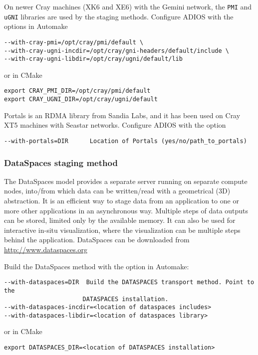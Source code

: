 \vspace*{6pt}
On newer Cray machines (XK6 and XE6) with the Gemini network, the \verb+PMI+ and \verb+uGNI+ libraries are used by the staging methods. Configure ADIOS with the options in Automake

\begin{lstlisting}
--with-cray-pmi=/opt/cray/pmi/default \
--with-cray-ugni-incdir=/opt/cray/gni-headers/default/include \
--with-cray-ugni-libdir=/opt/cray/ugni/default/lib
\end{lstlisting}

\noindent or in CMake
\begin{lstlisting}
export CRAY_PMI_DIR=/opt/cray/pmi/default
export CRAY_UGNI_DIR=/opt/cray/ugni/default
\end{lstlisting}

\vspace*{6pt}
Portals is an RDMA library from Sandia Labs, and it has been used on Cray XT5 machines with Seastar networks. Configure ADIOS with the option

\verb+--with-portals=DIR      Location of Portals (yes/no/path_to_portals)+

\subsubsection{DataSpaces staging method}
The DataSpaces model provides a separate server running on separate compute nodes, into/from which data can be written/read with a geometrical (3D) abstraction. It is an efficient way to stage data from an application to one or more other applications in an asynchronous way. Multiple steps of data outputs can be stored, limited only by the available memory.
It can also be used for interactive in-situ visualization, where the visualization can be multiple steps behind the application.
DataSpaces can be downloaded from \url{http://www.dataspaces.org}

\noindent Build the DataSpaces method with the option in Automake:

\begin{lstlisting}
--with-dataspaces=DIR  Build the DATASPACES transport method. Point to the
                      DATASPACES installation.
--with-dataspaces-incdir=<location of dataspaces includes>
--with-dataspaces-libdir=<location of dataspaces library>
\end{lstlisting}

\noindent or in CMake
\begin{lstlisting}
export DATASPACES_DIR=<location of DATASPACES installation>
\end{lstlisting}

